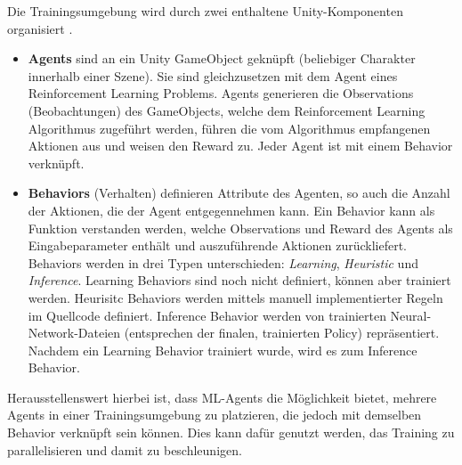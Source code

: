 Die Trainingsumgebung wird durch zwei enthaltene Unity-Komponenten organisiert \cite{mlagentsOverview}.
\begin{itemize}
    \item \textbf{Agents} sind an ein Unity GameObject geknüpft (beliebiger Charakter innerhalb einer Szene).
    Sie sind gleichzusetzen mit dem Agent eines Reinforcement Learning Problems.
    Agents generieren die Observations (Beobachtungen) des GameObjects, welche dem Reinforcement Learning Algorithmus zugeführt werden, führen die vom Algorithmus empfangenen Aktionen aus und weisen den Reward zu.
    Jeder Agent ist mit einem Behavior verknüpft.

    \item \textbf{Behaviors} (Verhalten) definieren Attribute des Agenten, so auch die Anzahl der Aktionen, die der Agent entgegennehmen kann.
    Ein Behavior kann als Funktion verstanden werden, welche Observations und Reward des Agents als Eingabeparameter enthält und auszuführende Aktionen zurückliefert.
    Behaviors werden in drei Typen unterschieden: \emph{Learning}, \emph{Heuristic} und \emph{Inference}.
    Learning Behaviors sind noch nicht definiert, können aber trainiert werden.
    Heurisitc Behaviors werden mittels manuell implementierter Regeln im Quellcode definiert.
    Inference Behavior werden von trainierten Neural-Network-Dateien (entsprechen der finalen, trainierten Policy) repräsentiert.
    Nachdem ein Learning Behavior trainiert wurde, wird es zum Inference Behavior.
\end{itemize}
Herausstellenswert hierbei ist, dass ML-Agents die Möglichkeit bietet, mehrere Agents in einer Trainingsumgebung zu platzieren, die jedoch mit demselben Behavior verknüpft sein können.
Dies kann dafür genutzt werden, das Training zu parallelisieren und damit zu beschleunigen.

